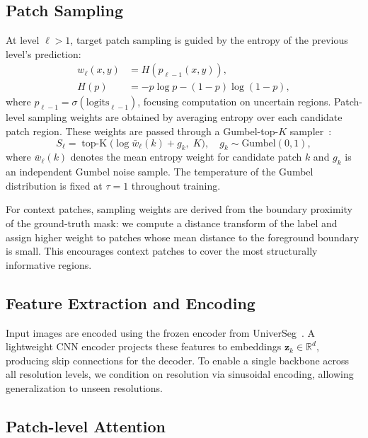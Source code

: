 \documentclass[10pt,twocolumn,letterpaper]{article}
\begin{document}
\subsection{Patch Sampling}
\label{sec:sampling}

At level $\ell > 1$, target patch sampling is guided by the entropy of the previous level's prediction:
\begin{align}
    w_\ell(x, y) &= H(p_{\ell-1}(x,y)), \nonumber \\
    H(p) &= -p\log p - (1-p)\log(1-p), \label{eq:entropy}
\end{align}
where $p_{\ell-1} = \sigma(\text{logits}_{\ell-1})$, focusing computation on uncertain regions. Patch-level sampling weights are obtained by averaging entropy over each candidate patch region. These weights are passed through a Gumbel-top-$K$ sampler~\cite{kool2019stochasticbeamsthemgumbeltopk}:
\begin{equation}
    S_\ell = \operatorname{top\text{-}K}\bigl(\log \bar{w}_\ell(k) + g_k,\; K\bigr), \quad g_k \sim \text{Gumbel}(0,1),
    \label{eq:gumbel}
\end{equation}
where $\bar{w}_\ell(k)$ denotes the mean entropy weight for candidate patch $k$ and $g_k$ is an independent Gumbel noise sample. The temperature of the Gumbel distribution is fixed at $\tau = 1$ throughout training.

For context patches, sampling weights are derived from the boundary proximity of the ground-truth mask: we compute a distance transform of the label and assign higher weight to patches whose mean distance to the foreground boundary is small. This encourages context patches to cover the most structurally informative regions.

\subsection{Feature Extraction and Encoding}
\label{sec:features}

Input images are encoded using the frozen encoder from UniverSeg~\cite{butoiUniverSegUniversalMedical2023}. A lightweight CNN encoder projects these features to embeddings $\mathbf{z}_k \in \mathbb{R}^{d}$, producing skip connections for the decoder. To enable a single backbone across all resolution levels, we condition on resolution via sinusoidal encoding, allowing generalization to unseen resolutions.

\subsection{Patch-level Attention}
\label{sec:attention}
\end{document}

